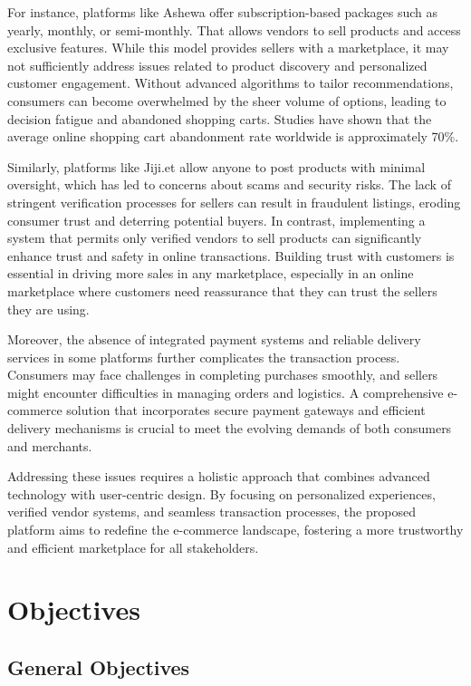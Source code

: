 \documentclass[12pt]{report}
\begin{document}
For instance, platforms like Ashewa offer subscription-based packages such as yearly,
monthly, or semi-monthly. That allows vendors to sell products and access exclusive features.
While this model provides sellers with a marketplace, it may not sufficiently address issues
related to product discovery and personalized customer engagement. Without advanced
algorithms to tailor recommendations, consumers can become overwhelmed by the sheer
volume of options, leading to decision fatigue and abandoned shopping carts. Studies have
shown that the average online shopping cart abandonment rate worldwide is approximately
70\%\cite{c6}.

Similarly, platforms like Jiji.et allow anyone to post products with minimal oversight, which
has led to concerns about scams and security risks. The lack of stringent verification
processes for sellers can result in fraudulent listings, eroding consumer trust and deterring
potential buyers. In contrast, implementing a system that permits only verified vendors to sell
products can significantly enhance trust and safety in online transactions. Building trust with
customers is essential in driving more sales in any marketplace, especially in an online
marketplace where customers need reassurance that they can trust the sellers they are using\cite{c7}.

Moreover, the absence of integrated payment systems and reliable delivery services in some
platforms further complicates the transaction process. Consumers may face challenges in
completing purchases smoothly, and sellers might encounter difficulties in managing orders
and logistics. A comprehensive e-commerce solution that incorporates secure payment
gateways and efficient delivery mechanisms is crucial to meet the evolving demands of both
consumers and merchants.

Addressing these issues requires a holistic approach that combines advanced technology with
user-centric design. By focusing on personalized experiences, verified vendor systems, and
seamless transaction processes, the proposed platform aims to redefine the e-commerce
landscape, fostering a more trustworthy and efficient marketplace for all stakeholders.

\section{Objectives}

\subsection{General Objectives}
\end{document}
